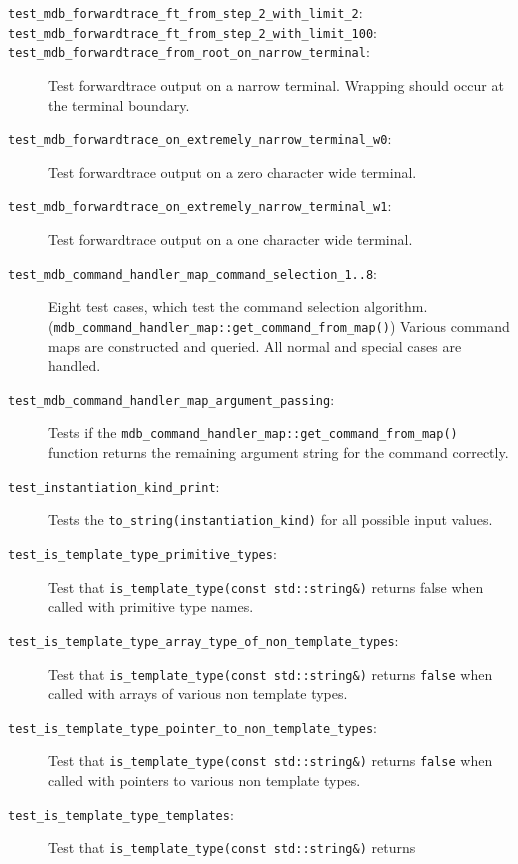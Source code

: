 \begin{description}
    \item[\texttt{test\_mdb\_forwardtrace\_ft\_from\_step\_2\_with\_limit\_2}:]
    \item[\texttt{test\_mdb\_forwardtrace\_ft\_from\_step\_2\_with\_limit\_100}:]
    \item[\texttt{test\_mdb\_forwardtrace\_from\_root\_on\_narrow\_terminal}:]
        Test forwardtrace output on a narrow terminal. Wrapping should occur
        at the terminal boundary.
    \item[\texttt{test\_mdb\_forwardtrace\_on\_extremely\_narrow\_terminal\_w0}:]
        Test forwardtrace output on a zero character wide terminal.
    \item[\texttt{test\_mdb\_forwardtrace\_on\_extremely\_narrow\_terminal\_w1}:]
        Test forwardtrace output on a one character wide terminal.
    \item[\texttt{test\_mdb\_command\_handler\_map\_command\_selection\_1..8}:]
        Eight test cases, which test the command selection algorithm.
        (\texttt{mdb\_command\_handler\_map::get\_command\_from\_map()})
        Various command maps are constructed and queried. All normal and
        special cases are handled.
    \item[\texttt{test\_mdb\_command\_handler\_map\_argument\_passing}:]
        Tests if the
        \texttt{mdb\_command\_handler\_map::get\_command\_from\_map()}
        function returns the remaining argument string for the command
        correctly.
    \item[\texttt{test\_instantiation\_kind\_print}:]
        Tests the \texttt{to\_string(instantiation\_kind)} for all possible
        input values.
    \item[\texttt{test\_is\_template\_type\_primitive\_types}:]
        Test that \texttt{is\_template\_type(const std::string\&)} returns
        false when called with primitive type names.
    \item[\texttt{test\_is\_template\_type\_array\_type\_of\_non\_template\_types}:]
        Test that \texttt{is\_template\_type(const std::string\&)} returns
        \texttt{false} when called with arrays of various non template types.
    \item[\texttt{test\_is\_template\_type\_pointer\_to\_non\_template\_types}:]
        Test that \texttt{is\_template\_type(const std::string\&)} returns
        \texttt{false} when called with pointers to various non template types.
    \item[\texttt{test\_is\_template\_type\_templates}:]
        Test that \texttt{is\_template\_type(const std::string\&)} returns

\end{description}
